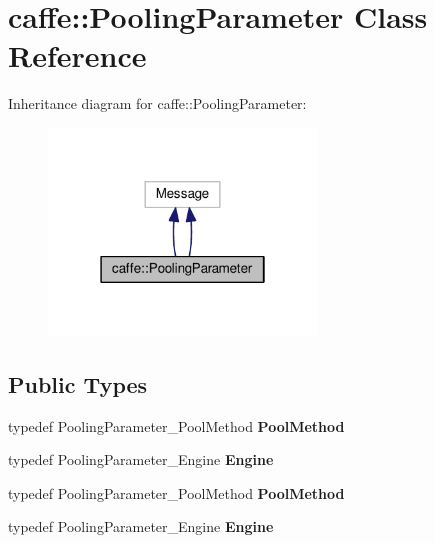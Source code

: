 \hypertarget{classcaffe_1_1_pooling_parameter}{}\section{caffe\+:\+:Pooling\+Parameter Class Reference}
\label{classcaffe_1_1_pooling_parameter}


Inheritance diagram for caffe\+:\+:Pooling\+Parameter\+:
\nopagebreak
\begin{figure}[H]
\begin{center}
\leavevmode
\includegraphics[width=202pt]{classcaffe_1_1_pooling_parameter__inherit__graph}
\end{center}
\end{figure}
\subsection*{Public Types}
\begin{DoxyCompactItemize}
\item 
\mbox{\label{classcaffe_1_1_pooling_parameter_aab335eaf726de0bd9135eb41099abfe8}} 
typedef Pooling\+Parameter\+\_\+\+Pool\+Method {\bfseries Pool\+Method}
\item 
\mbox{\label{classcaffe_1_1_pooling_parameter_a393733504a3d8d66ff9c3305dbbc5f2c}} 
typedef Pooling\+Parameter\+\_\+\+Engine {\bfseries Engine}
\item 
\mbox{\label{classcaffe_1_1_pooling_parameter_aab335eaf726de0bd9135eb41099abfe8}} 
typedef Pooling\+Parameter\+\_\+\+Pool\+Method {\bfseries Pool\+Method}
\item 
\mbox{\label{classcaffe_1_1_pooling_parameter_a393733504a3d8d66ff9c3305dbbc5f2c}} 
typedef Pooling\+Parameter\+\_\+\+Engine {\bfseries Engine}
\end{DoxyCompactItemize}
